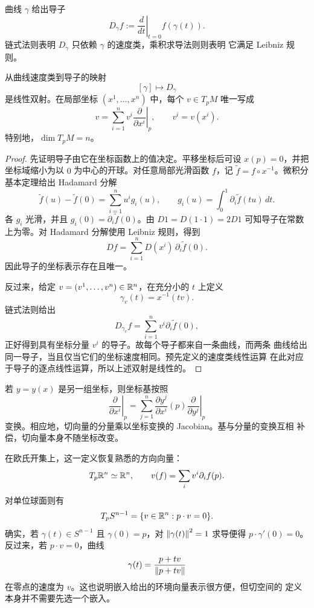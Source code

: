 曲线 \(\gamma\) 给出导子
\[
 D_\gamma f
 :=\left.\frac{d}{dt}\right|_{t=0}f(\gamma(t)).
\]
链式法则表明 \(D_\gamma\) 只依赖 \(\gamma\) 的速度类，乘积求导法则则表明
它满足 Leibniz 规则。

\begin{theorem}[切向量的曲线表示与导子表示]
\label{thm:tangent-curves-derivations}
从曲线速度类到导子的映射
\[
 [\gamma]\longmapsto D_\gamma
\]
是线性双射。在局部坐标 \((x^1,\ldots,x^n)\) 中，每个 \(v\in T_pM\)
唯一写成
\[
 v=\sum_{i=1}^n v^i
 \left.\frac{\partial}{\partial x^i}\right|_p,
 \qquad v^i=v(x^i).
\]
特别地，\(\dim T_pM=n\)。
\end{theorem}

\begin{proof}
先证明导子由它在坐标函数上的值决定。平移坐标后可设 \(x(p)=0\)，并把
坐标域缩小为以 \(0\) 为中心的开球。对任意局部光滑函数 \(f\)，记
\(\widetilde f=f\circ x^{-1}\)。微积分基本定理给出 Hadamard 分解
\[
 \widetilde f(u)-\widetilde f(0)
 =\sum_{i=1}^n u^i g_i(u),
 \qquad
 g_i(u)=\int_0^1\partial_i\widetilde f(tu)\,dt .
\]
各 \(g_i\) 光滑，并且
\(g_i(0)=\partial_i\widetilde f(0)\)。由
\(D1=D(1\cdot1)=2D1\) 可知导子在常数上为零。对 Hadamard 分解使用
Leibniz 规则，得到
\[
 Df=\sum_{i=1}^nD(x^i)\,\partial_i\widetilde f(0).
\]
因此导子的坐标表示存在且唯一。

反过来，给定 \(v=(v^1,\ldots,v^n)\in\mathbb{R}^n\)，在充分小的 \(t\) 上定义
\[
 \gamma_v(t)=x^{-1}(tv).
\]
链式法则给出
\[
 D_{\gamma_v}f
 =\sum_{i=1}^n v^i\partial_i\widetilde f(0),
\]
正好得到具有坐标分量 \(v^i\) 的导子。故每个导子都来自一条曲线，而两条
曲线给出同一导子，当且仅当它们的坐标速度相同。预先定义的速度类线性运算
在此对应于导子的逐点线性运算，所以上述双射是线性的。
\end{proof}

若 \(y=y(x)\) 是另一组坐标，则坐标基按照
\begin{equation}
 \left.\frac{\partial}{\partial x^i}\right|_p
 =\sum_{j=1}^n
 \frac{\partial y^j}{\partial x^i}(p)
 \left.\frac{\partial}{\partial y^j}\right|_p
 \label{eq:tangent-coordinate-change}
\end{equation}
变换。相应地，切向量的分量乘以坐标变换的 Jacobian。基与分量的变换互相
补偿，切向量本身不随坐标改变。

在欧氏开集上，这一定义恢复熟悉的方向向量：
\[
 T_p\mathbb{R}^n\simeq\mathbb{R}^n,\qquad
 v(f)=\sum_i v^i\partial_i f(p).
\]
对单位球面则有
\[
 T_pS^{n-1}=\{v\in\mathbb{R}^n:p\cdot v=0\}.
\]
确实，若 \(\gamma(t)\in S^{n-1}\) 且 \(\gamma(0)=p\)，对
\(\left\lVert\gamma(t)\right\rVert^2=1\) 求导便得 \(p\cdot\gamma'(0)=0\)。反过来，若
\(p\cdot v=0\)，曲线
\[
 \gamma(t)=\frac{p+tv}{\left\lVert p+tv\right\rVert}
\]
在零点的速度为 \(v\)。这也说明嵌入给出的环境向量表示很方便，但切空间的
定义本身并不需要先选一个嵌入。

